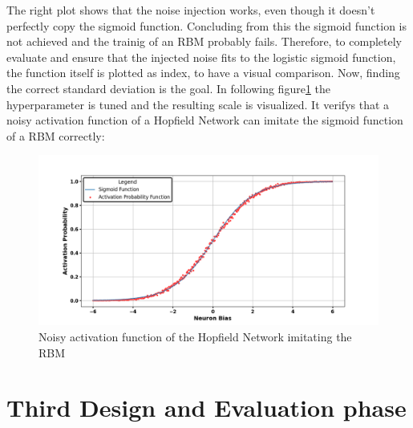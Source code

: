 The right plot shows that the noise injection works, even though it doesn't perfectly copy the sigmoid function.
Concluding from this the sigmoid function is not achieved and the trainig of an \ac{RBM} probably fails. 
Therefore, to completely evaluate and ensure that the injected noise fits to the logistic sigmoid function, the function itself is plotted 
as index, to have a visual comparison. 
Now, finding the correct standard deviation is the goal. 
In following figure\ref{Noisy_acitivation_function_good} the hyperparameter is tuned and the resulting scale is visualized.
It verifys that a noisy activation function of a Hopfield Network can imitate the sigmoid function of a \ac{RBM} correctly:
\begin{figure}[H]
    \centering
    \includegraphics[width=1\linewidth]{graphics/Noisy_HNN_2.png}
    \caption{Noisy activation function of the Hopfield Network imitating the \ac{RBM}}
    \label{Noisy_acitivation_function_good}
\end{figure}
\section{Third Design and Evaluation phase}

